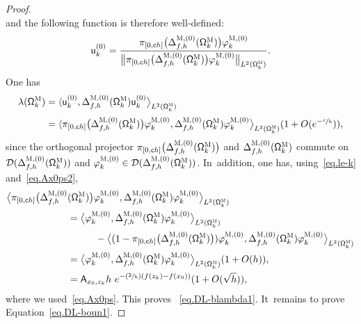 \documentclass[10pt]{amsart}
\newcommand{\Psfrac}[2]{(\sfrac{#1}{#2})}
\theoremstyle{plain}
\theoremstyle{definition}
\begin{document}
\begin{proof}
\begin{equation}
\end{equation}
and the following function is therefore well-defined:
\begin{equation}
\label{eq.QMK0=}
\mathsf u^{(0)}_k= \frac{ \pi_{[0,\mathsf ch ]}\bigl(\Delta_{f,h}^{\textsc{M},(0)} (\mathsf \Omega_k^{\textsc{M}})\bigr) \varphi^{\textsc{M},(0)}_k}{ \bigl\Vert\pi_{[0,\mathsf ch ]}\bigl(\Delta_{f,h}^{\textsc{M},(0)} (\mathsf \Omega_k^{\textsc{M}})\bigr) \varphi^{\textsc{M},(0)}_k \bigr\Vert_{L^2(\mathsf \Omega_k^{\textsc{M}})} }.
\end{equation}
One has
\begin{align}
\label{eq.lambdak-O=}
\lambda(\mathsf \Omega_k^{\textsc{M}})&= \langle \mathsf u^{(0)}_k, \Delta_{f,h}^{\textsc{M},(0)} (\mathsf \Omega_k^{\textsc{M}}) \mathsf u^{(0)}_k \big \rangle_{ L^2(\mathsf \Omega_k^{\textsc{M}})}\notag\\[-4pt]
\\[-10pt]
\nonumber
&= \langle \pi_{[0,\mathsf ch ]}\bigl(\Delta_{f,h}^{\textsc{M},(0)} (\mathsf \Omega_k^{\textsc{M}})\bigr) \varphi^{\textsc{M},(0)}_k, \Delta_{f,h}^{\textsc{M},(0)} (\mathsf \Omega_k^{\textsc{M}}) \varphi^{\textsc{M},(0)}_k \big \rangle_{ L^2(\mathsf \Omega_k^{\textsc{M}})} (1+O(e^{-\sfrac ch})),
\end{align}
since the orthogonal projector $\pi_{[0,\mathsf ch ]}\bigl(\Delta_{f,h}^{\textsc{M},(0)} (\mathsf \Omega_k^{\textsc{M}})\bigr) $ and $\Delta_{f,h}^{\textsc{M},(0)} (\mathsf \Omega_k^{\textsc{M}})$ commute on $\mathcal D(\Delta_{f,h}^{\textsc{M},(0)} (\mathsf \Omega_k^{\textsc{M}}))$ and $\varphi^{\textsc{M},(0)}_k \in \mathcal D(\Delta_{f,h}^{\textsc{M}, (0)}(\mathsf \Omega_k^{\textsc{M}}))$. In~addition, one has, using~\eqref{eq.le-k} and~\eqref{eq.Ax0ps2},
\begin{align*}
\bigl\langle \pi_{[0,\mathsf ch ]}\bigl(\Delta_{f,h}^{\textsc{M},(0)}& (\mathsf \Omega_k^{\textsc{M}})\bigr) \varphi^{\textsc{M},(0)}_k, \Delta_{f,h}^{\textsc{M},(0)} (\mathsf \Omega_k^{\textsc{M}}) \varphi^{\textsc{M},(0)}_k \bigr \rangle_{ L^2(\mathsf \Omega_k^{\textsc{M}})} \\
&= \bigl\langle \varphi^{\textsc{M},(0)}_k,
\Delta_{f,h}^{\textsc{M},(0)} (\mathsf \Omega_k^{\textsc{M}}) \varphi^{\textsc{M},(0)}_k \bigr \rangle_{ L^2(\mathsf \Omega_k^{\textsc{M}})} \\
& \hspace*{1cm} - \bigl\langle (1-\pi_{[0,\mathsf ch ]}\bigl(\Delta_{f,h}^{\textsc{M},(0)} (\mathsf \Omega_k^{\textsc{M}})\bigr)) \varphi^{\textsc{M},(0)}_k, \Delta_{f,h}^{\textsc{M},(0)} (\mathsf \Omega_k^{\textsc{M}}) \varphi^{\textsc{M},(0)}_k \bigr \rangle_{ L^2(\mathsf \Omega_k^{\textsc{M}})}\\
&=\bigl\langle \varphi^{\textsc{M},(0)}_k, \Delta_{f,h}^{\textsc{M},(0)} (\mathsf \Omega_k^{\textsc{M}}) \varphi^{\textsc{M},(0)}_k \big \rangle_{ L^2(\mathsf \Omega_k^{\textsc{M}})} (1+O(h)),\\
&= \mathsf A_{x_0,z_k} h \ e^{-\Psfrac 2h (f(z_k)-f(x_0))} (1+O(\sqrt h)),
\end{align*}
where we used~\eqref{eq.Ax0ps}. This proves
~\eqref{eq.DL-blambda1}. It~remains to prove Equation~\eqref{eq.DL-boun1}.


\end{proof}
\end{document}
